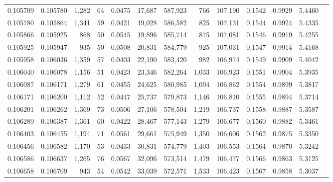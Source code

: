 \begin{tabular}{rrrrrrrrrrrrr}
0.105709 & 0.105780 & 1,282 &  64 &                                     0.0475 &  17,687 & 587,923 &     766 & 107,190 & 0.1542 & 0.9929 & 5.4460 \\
0.105780 & 0.105864 & 1,341 &  59 &                                     0.0421 &  19,028 & 586,582 &     825 & 107,131 & 0.1544 & 0.9924 & 5.4335 \\
0.105866 & 0.105925 &   868 &  50 &                                     0.0545 &  19,896 & 585,714 &     875 & 107,081 & 0.1546 & 0.9919 & 5.4255 \\
0.105925 & 0.105947 &   935 &  50 &                                     0.0508 &  20,831 & 584,779 &     925 & 107,031 & 0.1547 & 0.9914 & 5.4168 \\
0.105958 & 0.106036 & 1,359 &  57 &                                     0.0403 &  22,190 & 583,420 &     982 & 106,974 & 0.1549 & 0.9909 & 5.4042 \\
0.106040 & 0.106078 & 1,156 &  51 &                                     0.0423 &  23,346 & 582,264 &   1,033 & 106,923 & 0.1551 & 0.9904 & 5.3935 \\
0.106087 & 0.106171 & 1,279 &  61 &                                     0.0455 &  24,625 & 580,985 &   1,094 & 106,862 & 0.1554 & 0.9899 & 5.3817 \\
0.106171 & 0.106200 & 1,112 &  52 &                                     0.0447 &  25,737 & 579,873 &   1,146 & 106,810 & 0.1555 & 0.9894 & 5.3714 \\
0.106201 & 0.106262 & 1,369 &  73 &                                     0.0506 &  27,106 & 578,504 &   1,219 & 106,737 & 0.1558 & 0.9887 & 5.3587 \\
0.106289 & 0.106387 & 1,361 &  60 &                                     0.0422 &  28,467 & 577,143 &   1,279 & 106,677 & 0.1560 & 0.9882 & 5.3461 \\
0.106403 & 0.106455 & 1,194 &  71 &                                     0.0561 &  29,661 & 575,949 &   1,350 & 106,606 & 0.1562 & 0.9875 & 5.3350 \\
0.106456 & 0.106582 & 1,170 &  53 &                                     0.0433 &  30,831 & 574,779 &   1,403 & 106,553 & 0.1564 & 0.9870 & 5.3242 \\
0.106586 & 0.106637 & 1,265 &  76 &                                     0.0567 &  32,096 & 573,514 &   1,479 & 106,477 & 0.1566 & 0.9863 & 5.3125 \\
0.106658 & 0.106709 &   943 &  54 &                                     0.0542 &  33,039 & 572,571 &   1,533 & 106,423 & 0.1567 & 0.9858 & 5.3037 \\

\end{tabular}
